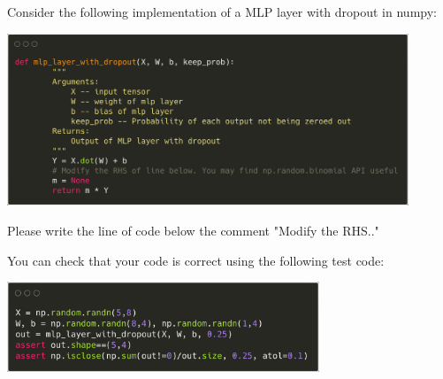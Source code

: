 \begin{frame}
\section{}
Consider the following implementation of a MLP layer with dropout in numpy:

\includegraphics[width=0.9\textwidth]{images/quiz_4_4_3_3a.png}

Please write the line of code below the comment "Modify the RHS.."

You can check that your code is correct using the following test code:

\includegraphics[width=0.7\textwidth]{images/quiz_4_4_3_3b.png}


\end{frame}


